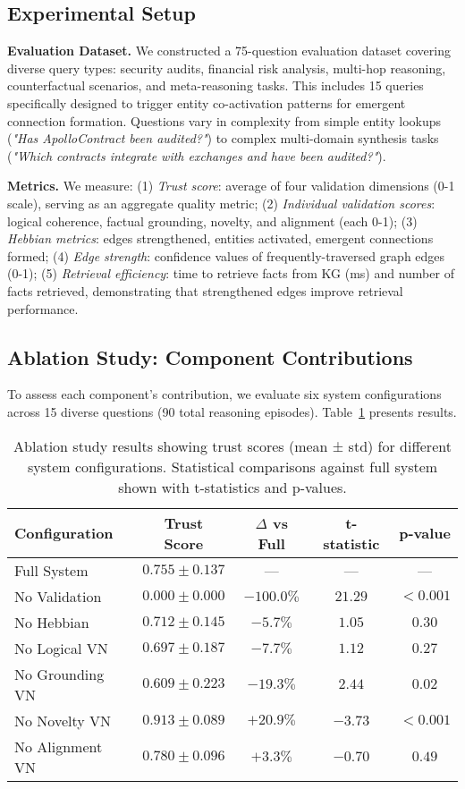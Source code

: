 \documentclass{article}
\begin{document}
\subsection{Experimental Setup}

\textbf{Evaluation Dataset.} We constructed a 75-question evaluation dataset covering diverse query types: security audits, financial risk analysis, multi-hop reasoning, counterfactual scenarios, and meta-reasoning tasks. This includes 15 queries specifically designed to trigger entity co-activation patterns for emergent connection formation. Questions vary in complexity from simple entity lookups (\textit{"Has ApolloContract been audited?"}) to complex multi-domain synthesis tasks (\textit{"Which contracts integrate with exchanges and have been audited?"}).

\textbf{Metrics.} We measure: (1) \textit{Trust score}: average of four validation dimensions (0-1 scale), serving as an aggregate quality metric; (2) \textit{Individual validation scores}: logical coherence, factual grounding, novelty, and alignment (each 0-1); (3) \textit{Hebbian metrics}: edges strengthened, entities activated, emergent connections formed; (4) \textit{Edge strength}: confidence values of frequently-traversed graph edges (0-1); (5) \textit{Retrieval efficiency}: time to retrieve facts from KG (ms) and number of facts retrieved, demonstrating that strengthened edges improve retrieval performance.

\subsection{Ablation Study: Component Contributions}

To assess each component's contribution, we evaluate six system configurations across 15 diverse questions (90 total reasoning episodes). Table~\ref{tab:ablation} presents results.

\begin{table}[h]
\centering
\caption{Ablation study results showing trust scores (mean ± std) for different system configurations. Statistical comparisons against full system shown with t-statistics and p-values.}
\label{tab:ablation}
\begin{tabular}{lcccc}
\toprule
\textbf{Configuration} & \textbf{Trust Score} & \textbf{$\Delta$ vs Full} & \textbf{t-statistic} & \textbf{p-value} \\
\midrule
Full System & $0.755 \pm 0.137$ & --- & --- & --- \\
No Validation & $0.000 \pm 0.000$ & $-100.0\%$ & $21.29$ & $< 0.001$ \\
No Hebbian & $0.712 \pm 0.145$ & $-5.7\%$ & $1.05$ & $0.30$ \\
No Logical VN & $0.697 \pm 0.187$ & $-7.7\%$ & $1.12$ & $0.27$ \\
No Grounding VN & $0.609 \pm 0.223$ & $-19.3\%$ & $2.44$ & $0.02$ \\
No Novelty VN & $0.913 \pm 0.089$ & $+20.9\%$ & $-3.73$ & $< 0.001$ \\
No Alignment VN & $0.780 \pm 0.096$ & $+3.3\%$ & $-0.70$ & $0.49$ \\
\bottomrule
\end{tabular}
\end{table}
\end{document}
